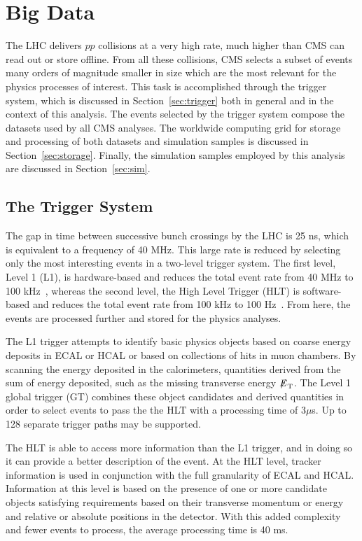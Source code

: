 \chapter{Big Data\label{ch:data}}

The LHC delivers $pp$ collisions at a very high rate, much higher than CMS can read out or store
offline. From all these collisions, CMS selects a subset of events many orders of magnitude smaller
in size
which are the most relevant for the physics processes of interest. This task is accomplished
through the trigger system, which is discussed in Section~\ref{sec:trigger} both in general and
in the context of this analysis. The events selected by the trigger system compose the datasets
used by all CMS analyses. The worldwide computing grid for storage and processing of both datasets
and simulation samples is discussed in Section~\ref{sec:storage}. Finally, the simulation samples
employed by this analysis are discussed in Section~\ref{sec:sim}.


\section{The Trigger System\label{sec:trigger}}

The gap in time between successive bunch crossings by the LHC is 25 ns, which is equivalent to
a frequency of 40 MHz. This large rate is reduced by selecting only the most interesting events
in a two-level trigger system. The first level, Level 1 (L1), is hardware-based and reduces the
total event rate from 40 MHz to 100 kHz~\cite{Bayatyan:706847}, whereas the second level,
the High Level Trigger (HLT) is software-based and reduces the total event rate from 100 kHz to
100 Hz~\cite{Virdee:1043242}. From here, the events are processed further and stored
for the physics analyses.

The L1 trigger attempts to identify basic physics objects based on coarse energy deposits in
ECAL or HCAL or
based on collections of hits in muon chambers. By scanning the energy deposited in the calorimeters,
quantities derived from the sum of energy deposited, such as the missing transverse energy ${\not\mathrel{E}}_{\text{T}}$.
The Level 1 global trigger (GT) combines these object candidates and derived quantities in order
to select events to pass the the HLT with a processing time of $3 \mu$s.
Up to 128 separate trigger paths may be supported.

The HLT is able to access more information than the L1 trigger, and in doing so it can provide
a better description of the event. At the HLT level, tracker information is used in conjunction with
the full granularity of ECAL and HCAL. Information at this level is based on the presence of one or
more candidate objects satisfying requirements based on their transverse momentum or energy and relative
or absolute positions in the detector. With this added complexity and fewer events to process,
the average processing time is 40 ms.

